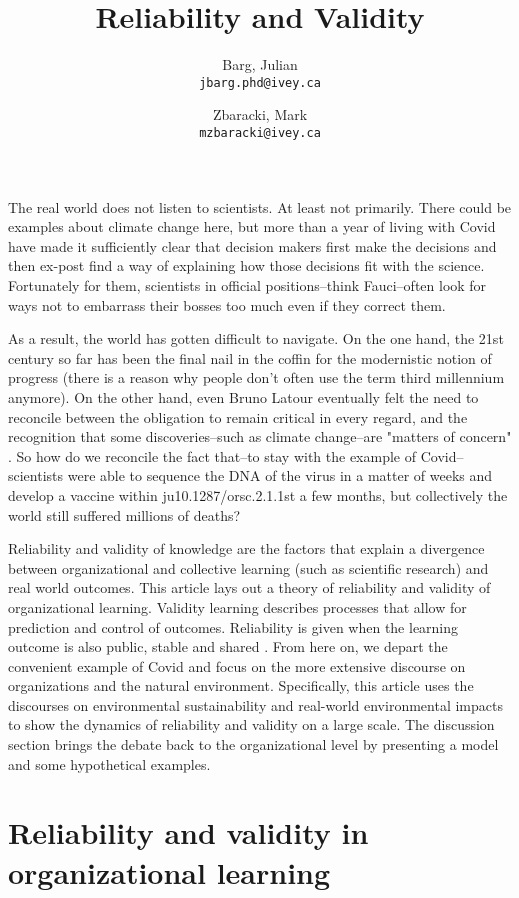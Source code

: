 \documentclass{article}
\title{Reliability and Validity}
\author{
	Barg, Julian\\
	\texttt{jbarg.phd@ivey.ca}
	\and
	Zbaracki, Mark\\
	\texttt{mzbaracki@ivey.ca}
}
\begin{document}
	\maketitle

	The real world does not listen to scientists. At least not primarily. There could be examples about climate change here, but more than a year of living with Covid have made it sufficiently clear that decision makers first make the decisions and then ex-post find a way of explaining how those decisions fit with the science. Fortunately for them, scientists in official positions--think Fauci--often look for ways not to embarrass their bosses too much even if they correct them.

	As a result, the world has gotten difficult to navigate. On the one hand, the 21st century so far has been the final nail in the coffin for the modernistic notion of progress (there is a reason why people don't often use the term third millennium anymore). On the other hand, even Bruno Latour eventually felt the need to reconcile between the obligation to remain critical in every regard, and the recognition that some discoveries--such as climate change--are "matters of concern" \citep{Latour2004}. So how do we reconcile the fact that--to stay with the example of Covid--scientists were able to sequence the DNA of the virus in a matter of weeks and develop a vaccine within ju10.1287/orsc.2.1.1st a few months, but collectively the world still suffered millions of deaths?

	Reliability and validity of knowledge are the factors that explain a divergence between organizational and collective learning (such as scientific research) and real world outcomes. This article lays out a theory of reliability and validity of organizational learning. Validity learning describes processes that allow for prediction and control of outcomes. Reliability is given when the learning outcome is also public, stable and shared \citep{March1991a}. From here on, we depart the convenient example of Covid and focus on the more extensive discourse on organizations and the natural environment. Specifically, this article uses the discourses on environmental sustainability and real-world environmental impacts to show the dynamics of reliability and validity on a large scale. The discussion section brings the debate back to the organizational level by presenting a model and some hypothetical examples.

	\section*{Reliability and validity in organizational learning}
\end{document}

